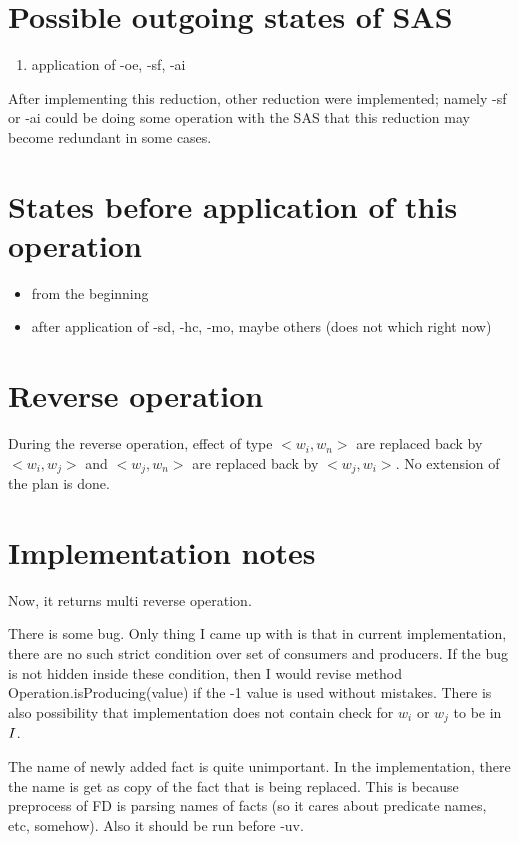	
	\section{Possible outgoing states of SAS}
	\begin{enumerate}
		\item application of -oe, -sf, -ai
	\end{enumerate}
	
	After implementing this reduction, other reduction were implemented; namely -sf or -ai could be doing some operation with the SAS that this reduction may become redundant in some cases.
	
	\section{States before application of this operation}
	\begin{itemize}
		\item from the beginning
		\item after application of -sd, -hc, -mo, maybe others (does not which right now)
	\end{itemize}
	
	
	\section{Reverse operation}
	During the reverse operation, effect of type $<w_i,w_n>$ are replaced back by $<w_i,w_j>$ and $<w_j,w_n>$ are replaced back by $<w_j,w_i>$. No extension of the plan is done.
	
	\section{Implementation notes}
	Now, it returns multi reverse operation.
	
	There is some bug. Only thing I came up with is that in current implementation, there are no such strict condition over set of consumers and producers. If the bug is not hidden inside these condition, then I would revise method Operation.isProducing(value) if the -1 value is used without mistakes. There is also possibility that implementation does not contain check for $w_i$ or $w_j$ to be in $I$.
	
	The name of newly added fact is quite unimportant. In the implementation, there the name is get as copy of the fact that is being replaced. This is because preprocess of FD is parsing names of facts (so it cares about predicate names, etc, somehow). Also it should be run before -uv.
	
